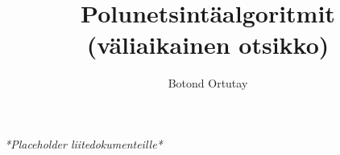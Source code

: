 \documentclass[language=finnish,version=final,mainfont=none,sharelatex=false]{utuftthesis}
\providecommand{\algorithmname}{Algoritmi}
\begin{document}
\title{Polunetsintäalgoritmit (väliaikainen otsikko)}
\author{Botond Ortutay}

\maketitle


\tableofcontents


\listoftables


\renewcommand{\algorithmname}{\listingscaption}


\begin{comment}
To better organize things, create a new tex file for each chapter
and input it below.

Avoid using the å, ä, ö or <space> characters in referred names and
underscores \_ in file names (may break hyperref).

Good luck!
\end{comment}









\printbibliography

\begin{comment}
Important! Create the appendix chapters with command \textbackslash appchapter\{some
name\} instead of \textbackslash chapter\{some name\} for the automagic
page counting to work!
\end{comment}



\textit{*Placeholder liitedokumenteille*}
\end{document}
